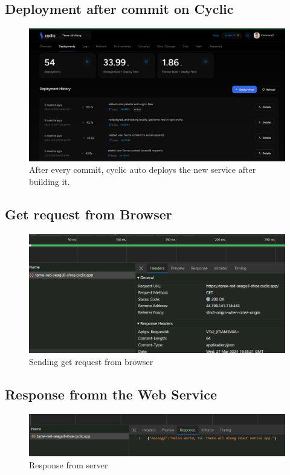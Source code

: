 \documentclass[11pt]{article}
\begin{document}
\subsection{Deployment after commit on Cyclic}
\begin{figure}[H]
    \centering
    \includegraphics[width=.95\textwidth]{automatic github deployments.png}
    \caption{After every commit, cyclic auto deploys the new service after building it. }
\end{figure}
\subsection{Get request from Browser}
\begin{figure}[H]
    \centering
    \includegraphics[width=.95\textwidth]{sending get request.png}
    \caption{Sending get request from browser}
\end{figure}
\subsection{Response fromn the Web Service}
\begin{figure}[H]
    \centering
    \includegraphics[width=.95\textwidth]{response.png}
    \caption{Response from server}
\end{figure}
\end{document}
